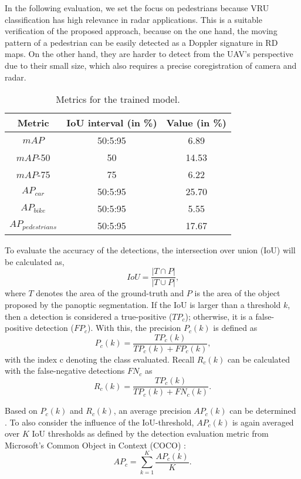 \documentclass[conference]{IEEEtran}
\begin{document}
In the following evaluation, we set the focus on pedestrians because VRU classification has high relevance in radar applications.
This is a suitable verification of the proposed approach, because on the one hand, the moving pattern of a pedestrian can be easily detected as a Doppler signature in RD maps.
On the other hand, they are harder to detect from the UAV's perspective due to their small size, which also requires a precise coregistration of camera and radar.

\begin{table}[tb]
    \centering
    \caption{Metrics for the trained model.}
    \begin{tabular}{c|c|S}
         \textbf{Metric} &  \textbf{IoU interval (in \%)} & \textbf{Value (in \%)}\\
         \hline
         $mAP$ &  50:5:95 &     6.89 \\
         $mAP$-50 &  50 &  14.53 \\
         $mAP$-75 &  75 &  6.22 \\
         $AP_{car}$ & 50:5:95 &   25.70 \\
         $AP_{bike}$ & 50:5:95 &  5.55 \\
        $AP_{pedestrians}$ &  50:5:95 & 17.67\\
    \end{tabular}
    \label{tab:metrics_panseg}
\end{table}

To evaluate the accuracy of the detections, the intersection over union (IoU) will be calculated as,
\begin{equation}
	IoU = \frac{|T \cap P|}{|T \cup P|} \text{,}
\end{equation}
where $T$ denotes the area of the ground-truth and $P$ is the area of the object proposed by the panoptic segmentation.
If the IoU is larger than a threshold $k$, then a detection is considered a true-positive ($TP_c$); otherwise, it is a false-positive detection ($FP_c$).
With this, the precision $P_c(k)$ is defined as
\begin{equation}
	P_c(k) = \frac{TP_c(k)}{TP_c(k) + FP_c(k)} \text{,}
\end{equation}
with the index $\text{c}$ denoting the class evaluated.
Recall $R_c(k)$ can be calculated with the false-negative detections $FN_c$ as
\begin{equation}
	R_c(k) = \frac{TP_c(k)}{TP_c(k) + FN_c(k)} \text{.}
\end{equation}

Based on $P_c(k)$ and $R_c(k)$, an average precision $AP_c(k)$ can be determined \cite{b19}.
To also consider the influence of the IoU-threshold, $AP_c(k)$ is again averaged over $K$ IoU thresholds as defined by the detection evaluation metric from Microsoft's Common Object in Context (COCO) \cite{b19}:
\begin{equation}
	AP_c = \sum_{k=1}^{K}\frac{AP_c(k)}{K} \text{.}
\end{equation}
\end{document}
